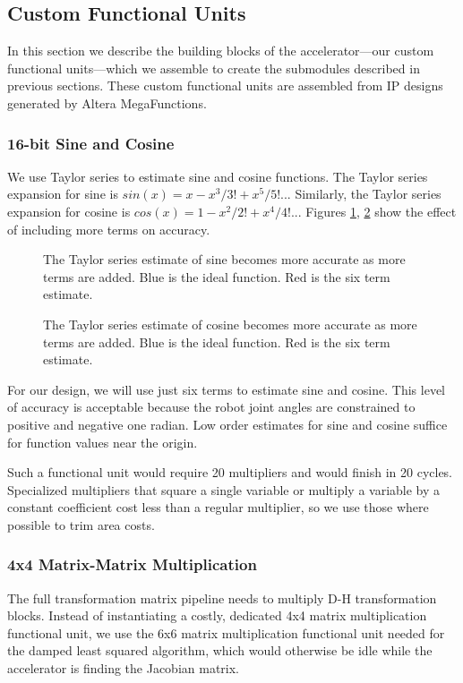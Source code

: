 \subsection{Custom Functional Units}
In this section we describe the building blocks of the accelerator---our custom functional units---which we assemble to create the submodules described in previous sections. These custom functional units are assembled from IP designs generated by Altera MegaFunctions.

\subsubsection{16-bit Sine and Cosine}
We use Taylor series to estimate sine and cosine functions. The Taylor series expansion for sine is $sin(x) = x - x^3/3! + x^5/5!$... Similarly, the Taylor series expansion for cosine is $cos(x) = 1 - x^2/2! + x^4/4!$... Figures  \ref{fig:sine}, \ref{fig:cosine} show the effect of including more terms on accuracy.

\begin{figure}[ht]
\center
{}
\caption{The Taylor series estimate of sine becomes more accurate as more terms are added. Blue is the ideal function. Red is the six term estimate.}
\label{fig:sine}
\end{figure}

\begin{figure}[ht]
\center
{}
\caption{The Taylor series estimate of cosine becomes more accurate as more terms are added. Blue is the ideal function. Red is the six term estimate.}
\label{fig:cosine}
\end{figure}

For our design, we will use just six terms to estimate sine and cosine. This level of accuracy is acceptable because the robot joint angles are constrained to positive and negative one radian. Low order estimates for sine and cosine suffice for function values near the origin.

Such a functional unit would require 20 multipliers and would finish in 20 cycles. Specialized multipliers that square a single variable or multiply a variable by a constant coefficient cost less than a regular multiplier, so we use those where possible to trim area costs.

\subsubsection{4x4 Matrix-Matrix Multiplication}
The full transformation matrix pipeline needs to multiply D-H transformation blocks. Instead of instantiating a costly, dedicated 4x4 matrix multiplication functional unit, we use the 6x6 matrix multiplication functional unit needed for the damped least squared algorithm, which would otherwise be idle while the accelerator is finding the Jacobian matrix.

